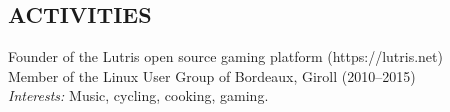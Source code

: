\documentclass[margin]{res}
\begin{document}
\begin{resume}
\section{ACTIVITIES}
    Founder of the Lutris open source gaming platform (https://lutris.net)\\
    Member of the Linux User Group of Bordeaux, Giroll (2010--2015)\\
    {\sl Interests:\/} Music, cycling, cooking, gaming.

\end{resume}
\end{document}
